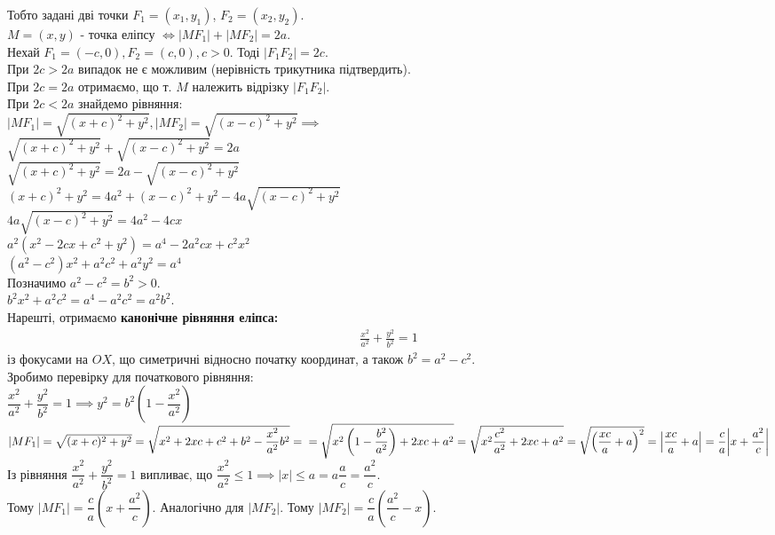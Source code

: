 \documentclass[a4paper, 10pt]{extarticle}
\theoremstyle{theoremdd}
\theoremstyle{theoremdd}
\theoremstyle{theoremdd}
\theoremstyle{theoremdd}
\theoremstyle{theoremdd}
\theoremstyle{theoremdd}
\theoremstyle{theoremdd}
\theoremstyle{theoremdd}
\begin{document}
Тобто задані дві точки $F_1 = (x_1,y_1)$, $F_2 = (x_2,y_2)$.\\
$M = (x,y)$ - точка еліпсу $\iff |MF_1|+|MF_2| = 2a$.
\bigskip \\
Нехай $F_1 = (-c,0), F_2 = (c,0), c > 0$. Тоді $|F_1F_2|=2c$.\\
При $2c > 2a$ випадок не є можливим (нерівність трикутника підтвердить).\\
При $2c = 2a$ отримаємо, що т. $M$ належить відрізку $|F_1F_2|$.\\
При $2c < 2a$ знайдемо рівняння:\\
$|MF_1|=\sqrt{(x+c)^2+y^2}, |MF_2|=\sqrt{(x-c)^2+y^2} \implies$\\
$\sqrt{(x+c)^2+y^2} + \sqrt{(x-c)^2+y^2} = 2a$\\
$\sqrt{(x+c)^2+y^2} = 2a - \sqrt{(x-c)^2+y^2}$\\
$(x+c)^2+y^2=4a^2+(x-c)^2+y^2-4a\sqrt{(x-c)^2+y^2}$\\
$4a\sqrt{(x-c)^2+y^2} = 4a^2 -4cx$\\
$a^2(x^2-2cx+c^2+y^2)=a^4-2a^2cx+c^2x^2$\\
$(a^2-c^2)x^2+a^2c^2+a^2y^2=a^4$\\
Позначимо $a^2-c^2=b^2>0$.\\
$b^2x^2+a^2c^2=a^4-a^2c^2=a^2b^2$.\\
Нарешті, отримаємо \textbf{канонічне рівняння еліпса:}
\begin{align*}
\frac{x^2}{a^2} + \frac{y^2}{b^2} = 1
\end{align*}
із фокусами на $OX$, що симетричні відносно початку координат, а також $b^2 = a^2 - c^2$.
\bigskip \\
Зробимо перевірку для початкового рівняння:\\
$\dfrac{x^2}{a^2} + \dfrac{y^2}{b^2} = 1 \implies y^2 = b^2\left(1 - \dfrac{x^2}{a^2} \right)$\\
$|MF_1| = \sqrt{(x+c)^2+y^2} = \sqrt{x^2+2xc+c^2+b^2 - \dfrac{x^2}{a^2}b^2} = \\ = \sqrt{x^2 \left(1 - \dfrac{b^2}{a^2} \right) + 2xc + a^2} = \sqrt{x^2 \dfrac{c^2}{a^2} + 2xc + a^2} = \sqrt{\left(\dfrac{xc}{a} + a\right)^2} = \abs{\dfrac{xc}{a}+a} = \dfrac{c}{a} \abs{x + \dfrac{a^2}{c}}$\\
Із рівняння $\dfrac{x^2}{a^2} + \dfrac{y^2}{b^2} = 1$ випливає, що $\dfrac{x^2}{a^2} \leq 1 \implies |x| \leq a = a \dfrac{a}{c} = \dfrac{a^2}{c}$.\\
Тому $|MF_1| = \dfrac{c}{a} \left(x + \dfrac{a^2}{c} \right)$. Аналогічно для $|MF_2|$. Тому $|MF_2| = \dfrac{c}{a} \left(\dfrac{a^2}{c} - x\right)$.\\
\end{document}
